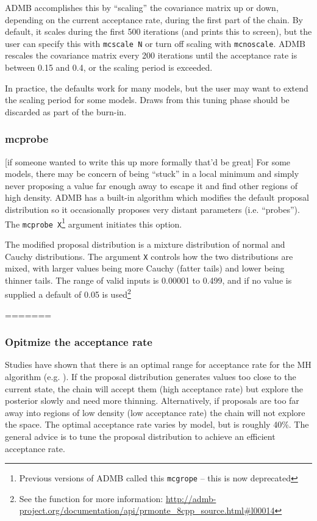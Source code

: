 \documentclass{article}\usepackage[]{graphicx}\usepackage[]{color}
\begin{document}
ADMB accomplishes this by ``scaling'' the covariance matrix
up or down, depending on the current acceptance rate, during
the first part of the chain. By default, it scales during
the first 500 iterations (and prints this to screen), but
the user can specify this with \texttt{mcscale N} or turn
off scaling with \texttt{mcnoscale}. ADMB rescales the
covariance matrix every 200 iterations until the acceptance
rate is between 0.15 and 0.4, or the scaling period is
exceeded.

In practice, the defaults work for many models, but the user
may want to extend the scaling period for some models. Draws
from this tuning phase should be discarded as part of the
burn-in.
\subsubsection{mcprobe}\label{sec:mcprobe}
\large{[if someone wanted to write this up more formally
  that'd be great]}
For some models, there may be concern of being ``stuck'' in
a local minimum and simply never proposing a value far
enough away to escape it and find other regions of high
density. ADMB has a built-in algorithm which modifies the
default proposal distribution so it occasionally proposes
very distant parameters (i.e. ``probes''). The
\texttt{mcprobe X}\footnote{Previous versions of ADMB called
  this \texttt{mcgrope} -- this is now deprecated} argument
initiates this option.

The modified proposal distribution is a mixture distribution
of normal and Cauchy distributions. The argument \texttt{X}
controls how the two distributions are mixed, with larger
values being more Cauchy (fatter tails) and lower being
thinner tails. The range of valid inputs is 0.00001 to
0.499, and if no value is supplied a default of 0.05 is
used\footnote{See the function for more information:
  \url{http://admb-project.org/documentation/api/prmonte\_8cpp\_source.html\#l00014}}

=======

\subsubsection{Opitmize the acceptance rate}
Studies have shown that there is an optimal range for
acceptance rate for the MH algorithm
(e.g. \cite{roberts2001}). If the proposal distribution
generates values too close to the current state, the chain
will accept them (high acceptance rate) but explore the
posterior slowly and need more thinning. Alternatively, if
proposals are too far away into regions of low density (low
acceptance rate) the chain will not explore the space. The
optimal acceptance rate varies by model, but is roughly
40\%. The general advice is to tune the proposal
distribution to achieve an efficient acceptance rate.
\end{document}
